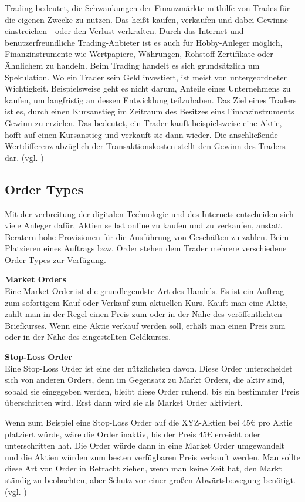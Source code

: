 \documentclass[oneside]{ausarbeitung}
\begin{document}
Trading bedeutet, die Schwankungen der Finanzmärkte mithilfe von
Trades für die eigenen Zwecke zu nutzen. Das heißt kaufen, verkaufen
und dabei Gewinne einstreichen - oder den Verlust verkraften. Durch
das Internet und benutzerfreundliche Trading-Anbieter ist es auch für
Hobby-Anleger möglich, Finanzinstrumente wie Wertpapiere, Währungen,
Rohstoff-Zertifikate oder Ähnlichem zu handeln. Beim Trading handelt
es sich grundsätzlich um Spekulation. Wo ein Trader sein Geld
investiert, ist meist von untergeordneter Wichtigkeit. Beispielsweise
geht es nicht darum, Anteile eines Unternehmens zu kaufen, um
langfristig an dessen Entwicklung teilzuhaben. Das Ziel eines Traders
ist es, durch einen Kursanstieg im Zeitraum des Besitzes eins
Finanzinstruments Gewinn zu erzielen. Das bedeutet, ein Trader kauft
beispielsweise eine Aktie, hofft auf einen Kursanstieg und verkauft
sie dann wieder. Die anschließende Wertdifferenz abzüglich der
Transaktionskosten stellt den Gewinn des Traders dar. (vgl.
\cite{trading_2})

\subsection{Order Types}
\label{sub:Order Types}

Mit der verbreitung der digitalen Technologie und des Internets entscheiden sich viele Anleger dafür, Aktien selbst online zu kaufen und zu verkaufen, anstatt Beratern hohe Provisionen für die Ausführung von Geschäften zu zahlen. Beim Platzieren eines Auftrags bzw. Order stehen dem Trader mehrere verschiedene Order-Types zur Verfügung.

\textbf{Market Orders} \\
Eine Market Order ist die grundlegendste Art des Handels. Es ist ein Auftrag zum sofortigem Kauf oder Verkauf zum aktuellen Kurs. Kauft man eine Aktie, zahlt man in der Regel einen Preis zum oder in der Nähe des veröffentlichten Briefkurses. Wenn eine Aktie verkauf werden soll, erhält man einen Preis zum oder in der Nähe des eingestellten Geldkurses.

\textbf{Stop-Loss Order} \\
Eine Stop-Loss Order ist eine der nützlichsten davon. Diese Order unterscheidet sich von anderen Orders, denn im Gegensatz zu Markt Orders, die aktiv sind, sobald sie eingegeben werden, bleibt diese Order ruhend, bis ein bestimmter Preis überschritten wird. Erst dann wird sie als Market Order aktiviert.

Wenn zum Beispiel eine Stop-Loss Order auf die XYZ-Aktien bei 45€ pro Aktie platziert würde, wäre die Order inaktiv, bis der Preis 45€ erreicht oder unterschritten hat. Die Order würde dann in eine Market Order umgewandelt und die Aktien würden zum besten verfügbaren Preis verkauft werden. Man sollte diese Art von Order in Betracht ziehen, wenn man keine Zeit hat, den Markt ständig zu beobachten, aber Schutz vor einer großen Abwärtsbewegung benötigt. (vgl. \cite{order_types})
\end{document}
